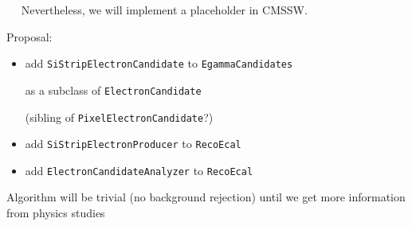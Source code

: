 \documentclass[landscape]{article}
\newenvironment{slide}[1][ ]{\mbox{\bf #1 } \vfill}{\vfill \mbox{ } \hfill \Large \arabic{page} \pagebreak}
\begin{document}
\begin{slide}
Nevertheless, we will implement a placeholder in CMSSW.

\vspace{1 cm}
Proposal:

\vspace{0.5 cm}
\begin{center}
\begin{minipage}{0.9\linewidth}
\begin{itemize}

\item add {\tt SiStripElectronCandidate} to {\tt EgammaCandidates}

\vspace{0.5 cm}
\begin{center}
\begin{minipage}{0.9\linewidth}
as a subclass of {\tt ElectronCandidate}

\vspace{0.5 cm}
(sibling of {\tt PixelElectronCandidate}?)
\end{minipage}
\end{center}

\vspace{1 cm}
\item add {\tt SiStripElectronProducer} to {\tt RecoEcal}

\vspace{1 cm}
\item add {\tt ElectronCandidateAnalyzer} to {\tt RecoEcal}
\end{itemize}
\end{minipage}
\end{center}

\vspace{1 cm}
Algorithm will be trivial (no background rejection) until we get more
information from physics studies

\end{slide}
\end{document}
